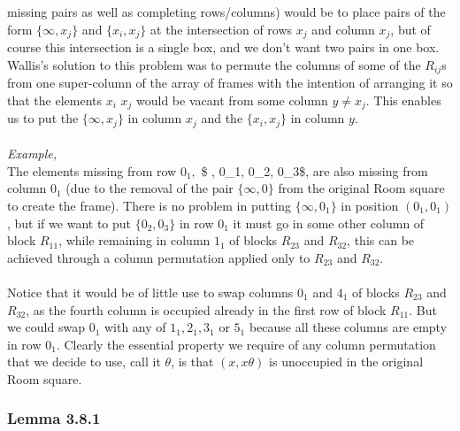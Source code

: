 \documentclass[
  12pt,
  a4paper]{book}
\begin{document}
missing pairs as well as completing rows/columns) would be to place
pairs of the form \(\{\infty, x_j\}\) and \(\{x_i, x_j\}\) at the
intersection of rows \(x_j\) and column \(x_j\), but of course this
intersection is a single box, and we don't want two pairs in one box.
Wallis's solution to this problem was to permute the columns of some of
the \(R_{ij}\)s from one super-column of the array of frames with the
intention of arranging it so that the elements \(x_i\) \(x_j\) would be
vacant from some column \(y \neq x_j\). This enables us to put the
\(\{\infty, x_j\}\) in column \(x_j\) and the \(\{x_i,x_j\}\) in column \(y\).\\
~\\
\emph{Example,}\\
The elements missing from row \(0_1,\) \$ \infty, 0\_1, 0\_2, 0\_3\$, are also
missing from column \(0_1\) (due to the removal of the pair \(\{\infty,0\}\)
from the original Room square to create the frame). There is no problem
in putting \(\{\infty,0_1\}\) in position \((0_1,0_1)\), but if we want to
put \(\{0_2,0_3\}\) in row \(0_1\) it must go in some other column of block
\(R_{11}\), while remaining in column \(1_1\) of blocks \(R_{23}\) and
\(R_{32}\), this can be achieved through a column permutation applied only
to \(R_{23}\) and \(R_{32}\).\\
~\\
Notice that it would be of little use to swap columns \(0_1\) and \(4_1\) of
blocks \(R_{23}\) and \(R_{32}\), as the fourth column is occupied already
in the first row of block \(R_{11}\). But we could swap \(0_1\) with any of
\(1_1,2_1,3_1\) or \(5_1\) because all these columns are empty in row \(0_1\).
Clearly the essential property we require of any column permutation that
we decide to use, call it \(\theta\), is that \((x,x\theta)\) is unoccupied
in the original Room square.

\hypertarget{lemma-3.8.1}{%
\subsubsection{Lemma 3.8.1}\label{lemma-3.8.1}}
\end{document}
